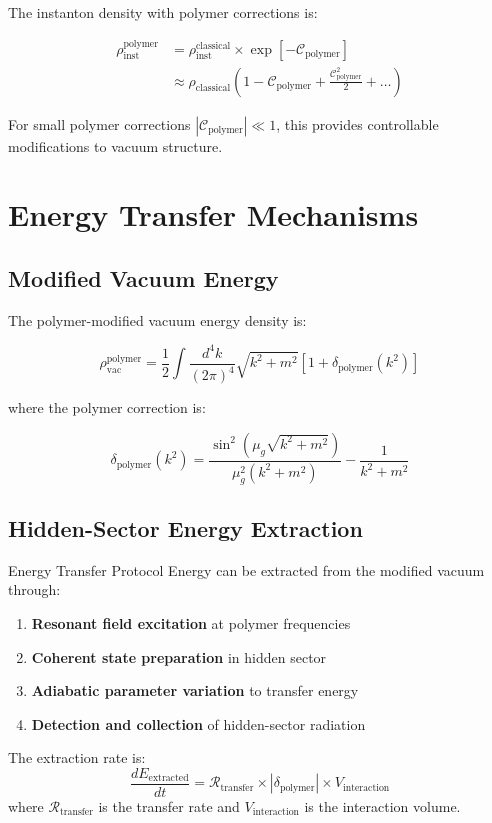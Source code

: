 \documentclass[12pt]{article}
\begin{document}
The instanton density with polymer corrections is:

\begin{align}
\rho_{\text{inst}}^{\text{polymer}} &= \rho_{\text{inst}}^{\text{classical}} \times \exp\left[ -\mathcal{C}_{\text{polymer}} \right] \\
&\approx \rho_{\text{classical}} \left( 1 - \mathcal{C}_{\text{polymer}} + \frac{\mathcal{C}_{\text{polymer}}^2}{2} + \ldots \right)
\end{align}

For small polymer corrections $|\mathcal{C}_{\text{polymer}}| \ll 1$, this provides controllable modifications to vacuum structure.

\section{Energy Transfer Mechanisms}

\subsection{Modified Vacuum Energy}

The polymer-modified vacuum energy density is:

\begin{equation}
\rho_{\text{vac}}^{\text{polymer}} = \frac{1}{2} \int \frac{d^4k}{(2\pi)^4} \sqrt{k^2 + m^2} \left[ 1 + \delta_{\text{polymer}}(k^2) \right]
\end{equation}

where the polymer correction is:

\begin{equation}
\delta_{\text{polymer}}(k^2) = \frac{\sin^2(\mu_g \sqrt{k^2 + m^2})}{\mu_g^2 (k^2 + m^2)} - \frac{1}{k^2 + m^2}
\end{equation}

\subsection{Hidden-Sector Energy Extraction}

\begin{physicsbox}{Energy Transfer Protocol}
Energy can be extracted from the modified vacuum through:

\begin{enumerate}
\item \textbf{Resonant field excitation} at polymer frequencies
\item \textbf{Coherent state preparation} in hidden sector
\item \textbf{Adiabatic parameter variation} to transfer energy
\item \textbf{Detection and collection} of hidden-sector radiation
\end{enumerate}

The extraction rate is:
\begin{equation}
\frac{dE_{\text{extracted}}}{dt} = \mathcal{R}_{\text{transfer}} \times |\delta_{\text{polymer}}| \times V_{\text{interaction}}
\end{equation}
where $\mathcal{R}_{\text{transfer}}$ is the transfer rate and $V_{\text{interaction}}$ is the interaction volume.
\end{physicsbox}
\end{document}
